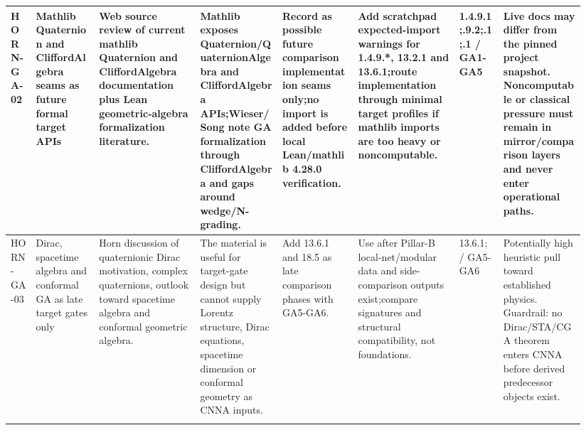 \begin{longtable}{L{0.04\linewidth} L{0.105\linewidth} L{0.16\linewidth} L{0.13\linewidth} L{0.125\linewidth} L{0.165\linewidth} L{0.075\linewidth} L{0.135\linewidth}}
\hline
\addlinespace[0.24em]
HORN-GA-02 & Mathlib Quaternion and CliffordAlgebra seams as future formal target APIs & Web source review of current mathlib Quaternion and CliffordAlgebra documentation plus Lean geometric-algebra formalization literature. & Mathlib exposes Quaternion/\allowbreak{}QuaternionAlgebra and CliffordAlgebra APIs;\newline Wieser/\allowbreak{}Song note GA formalization through CliffordAlgebra and gaps around wedge/\allowbreak{}N-grading. & Record as possible future comparison implementation seams only;\newline no import is added before local Lean/\allowbreak{}mathlib 4.28.0 verification. & Add scratchpad expected-import warnings for 1.4.9.*, 13.2.1 and 13.6.1;\newline route implementation through minimal target profiles if mathlib imports are too heavy or noncomputable. & 1.4.9.1;.9.2;.1;.1 /\allowbreak{} GA1-GA5 & Live docs may differ from the pinned project snapshot. Noncomputable or classical pressure must remain in mirror/\allowbreak{}comparison layers and never enter operational paths.\\
\hline
\addlinespace[0.24em]
HORN-GA-03 & Dirac, spacetime algebra and conformal GA as late target gates only & Horn discussion of quaternionic Dirac motivation, complex quaternions, outlook toward spacetime algebra and conformal geometric algebra. & The material is useful for target-gate design but cannot supply Lorentz structure, Dirac equations, spacetime dimension or conformal geometry as CNNA inputs. & Add 13.6.1 and 18.5 as late comparison phases with GA5-GA6. & Use after Pillar-B local-net/\allowbreak{}modular data and side-comparison outputs exist;\newline compare signatures and structural compatibility, not foundations. & 13.6.1; /\allowbreak{} GA5-GA6 & Potentially high heuristic pull toward established physics. Guardrail: no Dirac/\allowbreak{}STA/\allowbreak{}CGA theorem enters CNNA before derived predecessor objects exist.\\
\hline
\addlinespace[0.24em]

\end{longtable}
